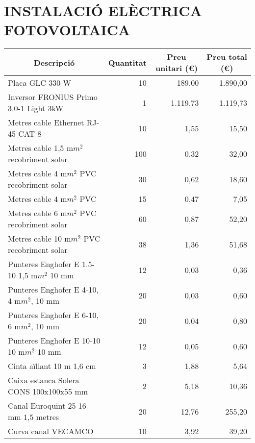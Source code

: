 \section{\uppercase{Instal\Lgem ació elèctrica fotovoltaica}}
\begin{table}[H]
  \begin{center}
    \begin{tabularx} {\textwidth} {|X|r|r|r|} \hline
  \multicolumn{1}{|c|}{Descripció} &  \multicolumn{1}{c|}{Quantitat} & \multicolumn{1}{c|}{Preu unitari (€)} &  \multicolumn{1}{c|}{Preu total (€)}\\ \hline \hline
    Placa GLC 330 W & 10    & 189,00 & 1.890,00 \\ \hline
    Inversor FRONIUS Primo 3.0-1 Light 3kW & 1     & 1.119,73 & 1.119,73 \\ \hline
    Metres cable Ethernet RJ-45 CAT 8 & 10    & 1,55  & 15,50 \\ \hline
    Metres cable 1,5 m$m^2$ recobriment solar & 100   & 0,32  & 32,00 \\ \hline
    Metres cable 4 m$m^2$ PVC recobriment solar & 30    & 0,62  & 18,60 \\ \hline
    Metres cable 4 m$m^2$ PVC & 15    & 0,47  & 7,05 \\ \hline
    Metres cable 6 m$m^2$ PVC recobriment solar & 60    & 0,87  & 52,20 \\ \hline
    Metres cable 10 m$m^2$ PVC recobriment solar & 38    & 1,36  & 51,68 \\ \hline
    Punteres Enghofer E 1.5-10 1,5 m$m^2$ 10 mm & 12    & 0,03  & 0,36 \\ \hline
    Punteres Enghofer E 4-10, 4 m$m^2$, 10 mm & 20    & 0,03  & 0,60 \\ \hline
    Punteres Enghofer E 6-10, 6 m$m^2$, 10 mm & 20    & 0,04  & 0,80 \\ \hline
    Punteres Enghofer E 10-10 10 m$m^2$ 10 mm & 12    & 0,05  & 0,60 \\ \hline
    Cinta aïllant 10 m 1,6 cm & 3     & 1,88  & 5,64 \\ \hline
    Caixa estanca Solera CONS 100x100x55 mm & 2     & 5,18  & 10,36 \\ \hline
    Canal Euroquint 25 16 mm 1,5 metres & 20    & 12,76 & 255,20 \\ \hline
    Curva canal VECAMCO & 10    & 3,92  & 39,20 \\ \hline
    \end{tabularx}%
  \end{center}
  \label{tab:addlabel}%
\end{table}%



